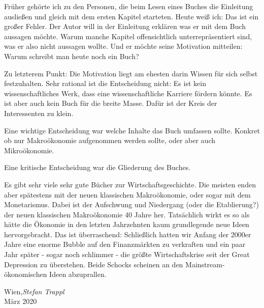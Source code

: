 %
%
%

\preface


Früher gehörte ich zu den Personen, die beim Lesen eines Buches die Einleitung ausließen und gleich mit dem ersten Kapitel starteten. Heute weiß ich: Das ist ein großer Fehler. Der Autor will in der Einleitung erklären was er mit dem Buch aussagen möchte. Warum manche Kapitel offensichtlich unterrepräsentiert sind, was er also nicht aussagen wollte. Und er möchte seine Motivation mitteilen: Warum schreibt man heute noch ein Buch?

Zu letzterem Punkt: Die Motivation liegt am ehesten darin Wissen für sich selbst festzuhalten. Sehr rational ist die Entscheidung nicht: Es ist kein wissenschaftliches Werk, dass eine wissenschaftliche Karriere fördern könnte. Es ist aber auch kein Buch für die breite Masse. Dafür ist der Kreis der Interessenten zu klein.

Eine wichtige Entscheidung war welche Inhalte das Buch umfassen sollte. Konkret ob nur Makroökonomie aufgenommen werden sollte, oder aber auch Mikroökonomie. 

Eine kritische Entscheidung war die Gliederung des Buches. 

Es gibt sehr viele sehr gute Bücher zur Wirtschaftsgeschichte. Die meisten enden aber spätestens mit der neuen klassischen Makroökonomie, oder sogar mit dem Monetarismus. Dabei ist der Aufschwung und Niedergang (oder die Etablierung?) der neuen klassischen Makroökonomie 40 Jahre her. Tatsächlich wirkt es so als hätte die Ökonomie in den letzten Jahrzehnten kaum grundlegende neue Ideen hervorgebracht. Das ist überraschend: Schließlich hatten wir Anfang der 2000er Jahre eine enorme Bubble auf den Finanzmärkten zu verkraften und ein paar Jahr später - sogar noch schlimmer - die größte Wirtschaftskrise seit der Great Depression zu überstehen. Beide Schocks scheinen an den Mainstream-ökonomischen Ideen abzuprallen.


\vspace{1cm}
\begin{flushright}\noindent
Wien,\hfill {\it Stefan Trappl}\\
März 2020\hfill
\end{flushright}


